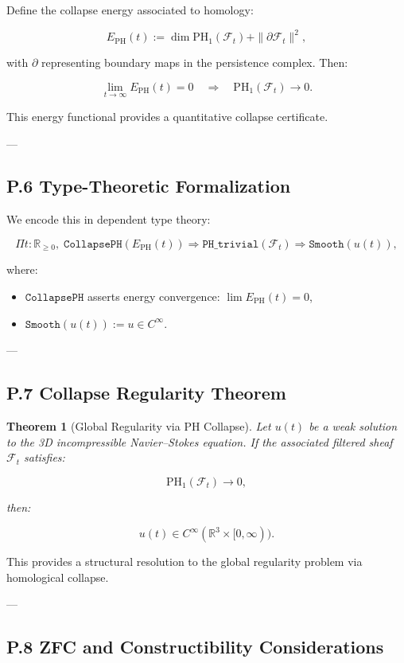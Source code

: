 \documentclass[11pt]{article}
\newtheorem{theorem}{Theorem}[section]
\begin{document}
Define the collapse energy associated to homology:

\[
E_{\mathrm{PH}}(t) := \dim \mathrm{PH}_1(\mathcal{F}_t) + \|\partial \mathcal{F}_t\|^2,
\]

with $\partial$ representing boundary maps in the persistence complex. Then:

\[
\lim_{t \to \infty} E_{\mathrm{PH}}(t) = 0 \quad \Rightarrow \quad \mathrm{PH}_1(\mathcal{F}_t) \to 0.
\]

This energy functional provides a quantitative collapse certificate.

---

\subsection*{P.6 Type-Theoretic Formalization}

We encode this in dependent type theory:

\[
\Pi t : \mathbb{R}_{\ge 0},\;
\texttt{CollapsePH}(E_{\mathrm{PH}}(t)) \Rightarrow
\texttt{PH\_trivial}(\mathcal{F}_t) \Rightarrow
\texttt{Smooth}(u(t)),
\]

where:
\begin{itemize}
  \item $\texttt{CollapsePH}$ asserts energy convergence: $\lim E_{\mathrm{PH}}(t) = 0$,
  \item $\texttt{Smooth}(u(t)) := u \in C^\infty$.
\end{itemize}

---

\subsection*{P.7 Collapse Regularity Theorem}

\begin{theorem}[Global Regularity via PH Collapse]
Let $u(t)$ be a weak solution to the 3D incompressible Navier–Stokes equation.  
If the associated filtered sheaf $\mathcal{F}_t$ satisfies:

\[
\mathrm{PH}_1(\mathcal{F}_t) \to 0,
\]

then:

\[
u(t) \in C^\infty(\mathbb{R}^3 \times [0, \infty)).
\]
\end{theorem}

This provides a structural resolution to the global regularity problem via homological collapse.

---

\subsection*{P.8 ZFC and Constructibility Considerations}
\end{document}
